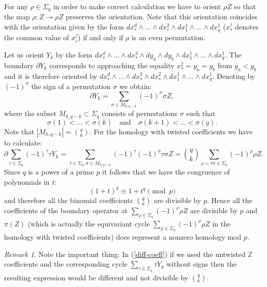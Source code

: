 \documentclass[12pt,a4paper,oneside]{amsart}
\theoremstyle{definition}
\theoremstyle{remark}
\newtheorem{rem}[thm]{Remark}
\numberwithin{equation}{section}
\newcommand{\Sg}{\Sigma}
\begin{document}
For any $\rho\in \Sg_q$ in order to make correct calculation we have to orient $\rho Z$ so that the map $\rho : Z\to \rho Z$ preserves the orientation. Note that this orientation coincides with the orientation given by the form $dx_*^d\wedge \dots \wedge dx_*^2\wedge dx_1^1\wedge \dots \wedge dx_q^1$ ($x_*^j$ denotes the common value of $x_i^j$) if and only if $\rho$ is an even permutation.

Let us orient $Y_k$ by the form $dx_*^d\wedge \dots \wedge dx_*^3\wedge dy_a\wedge dy_b \wedge dx_1^1\wedge \dots \wedge dx_q^1$. The boundary $\partial Y_k$ corresponds to approaching the equality $x_*^2 = y_a = y_b$ from $y_a < y_b$ and it is therefore oriented by $dx_*^d\wedge \dots \wedge dx_*^3\wedge dx_*^2 \wedge dx_1^1\wedge \dots \wedge dx_q^1$. Denoting by $(-1)^\sigma$ the sign of a permutation $\sigma$ we obtain:
$$
\partial Y_k = \sum_{\sigma\in M_{k, q-k}} (-1)^\sigma \sigma Z,
$$
where the subset $M_{k, q-k}\subset \Sg_q$ consists of permutations $\sigma$ such that
$$
\sigma(1) < \dots < \sigma(k)\quad\text{and}\quad \sigma(k+1) < \dots < \sigma(q).
$$
Note that $|M_{k, q-k}|=\binom{q}{k}$. For the homology with twisted coefficients we have to calculate:
\begin{equation}
\label{diff-coeff}
\partial \sum_{\tau\in \Sg_q} (-1)^\tau \tau Y_k = \sum_{\tau\in \Sg_q, \sigma\in M_{k, q-k}}  (-1)^\tau (-1)^\sigma \tau \sigma Z = \binom{q}{k} \sum_{\rho =\tau\sigma\in\Sg_q} (-1)^\rho \rho Z.
\end{equation}
Since $q$ is a power of a prime $p$ it follows that we have the congruence of polynomials in $t$:
$$
(1+t)^q \equiv 1 + t^q \pmod p
$$
and therefore all the binomial coefficients $\binom{q}{k}$ are divisible by $p$. Hence all the coefficients of the boundary operator at $\sum_{\rho\in \Sg_q} (-1)^\rho \rho Z$ are divisible by $p$ and $\pi(Z)$ (which is actually the equivariant cycle $\sum_{\rho\in \Sg_q} (-1)^\rho \rho Z$ in the homology with twisted coefficients) does represent a nonzero homology mod $p$.

\begin{rem}
Note the important thing: In (\ref{diff-coeff}) if we used the untwisted $\mathbb Z$ coefficients and the corresponding cycle $\sum_{\tau\in \Sg_q} \tau Y_k$ without signs then the resulting expression would be different and not divisible by $\binom{q}{k}$.
\end{rem}
\end{document}
